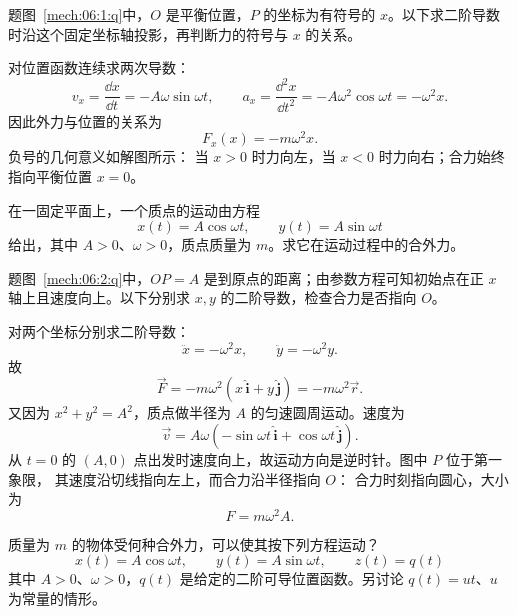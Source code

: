 {\begin{xesolution}题图~\ref{mech:06:1:q}中，$O$ 是平衡位置，$P$ 的坐标为有符号的 $x$。以下求二阶导数时沿这个固定坐标轴投影，再判断力的符号与 $x$ 的关系。

对位置函数连续求两次导数：
\[
  v_x=\frac{\dd x}{\dd t}=-A\omega\sin\omega t,
  \qquad
  a_x=\frac{\dd^2x}{\dd t^2}=-A\omega^2\cos\omega t=-\omega^2x.
\]
因此外力与位置的关系为
\[
  \boxed{F_x(x)=-m\omega^2x}.
\]
负号的几何意义如解图所示：
\soldiagTwoOne
当 $x>0$ 时力向左，当 $x<0$ 时力向右；合力始终指向平衡位置 $x=0$。
\end{xesolution}

\begin{origexamplebox}{}\label{ch06:ex:s04-2-2}
在一固定平面上，一个质点的运动由方程
\[
  x(t)=A\cos\omega t,
  \qquad
  y(t)=A\sin\omega t
\]
给出，其中 $A>0$、$\omega>0$，质点质量为 $m$。求它在运动过程中的合外力。

\begin{qualityfigure}
\label{mech:06:2:q}
\end{qualityfigure}
\end{origexamplebox}

\begin{xesolution}题图~\ref{mech:06:2:q}中，$OP=A$ 是到原点的距离；由参数方程可知初始点在正 $x$ 轴上且速度向上。以下分别求 $x,y$ 的二阶导数，检查合力是否指向 $O$。

对两个坐标分别求二阶导数：
\[
  \ddot x=-\omega^2x,
  \qquad
  \ddot y=-\omega^2y.
\]
故
\[
  \boxed{\vec F=-m\omega^2(x\,\hat{\boldsymbol i}+y\,\hat{\boldsymbol j})
  =-m\omega^2\vec r}.
\]
又因为 $x^2+y^2=A^2$，质点做半径为 $A$ 的匀速圆周运动。速度为
\[
 \vec v=A\omega(-\sin\omega t\,\hat{\boldsymbol i}
 +\cos\omega t\,\hat{\boldsymbol j}).
\]
从 $t=0$ 的 $(A,0)$ 点出发时速度向上，故运动方向是逆时针。图中 $P$ 位于第一象限，
其速度沿切线指向左上，而合力沿半径指向 $O$：
\soldiagTwoTwo
合力时刻指向圆心，大小为
\[
  \boxed{F=m\omega^2A}.
\]
\end{xesolution}

\begin{origexamplebox}{}\label{ch06:ex:s04-2-3}
质量为 $m$ 的物体受何种合外力，可以使其按下列方程运动？
\[
  x(t)=A\cos\omega t,
  \qquad y(t)=A\sin\omega t,
  \qquad z(t)=q(t)
\]
其中 $A>0$、$\omega>0$，$q(t)$ 是给定的二阶可导位置函数。另讨论 $q(t)=ut$、$u$ 为常量的情形。


\end{origexamplebox}}
